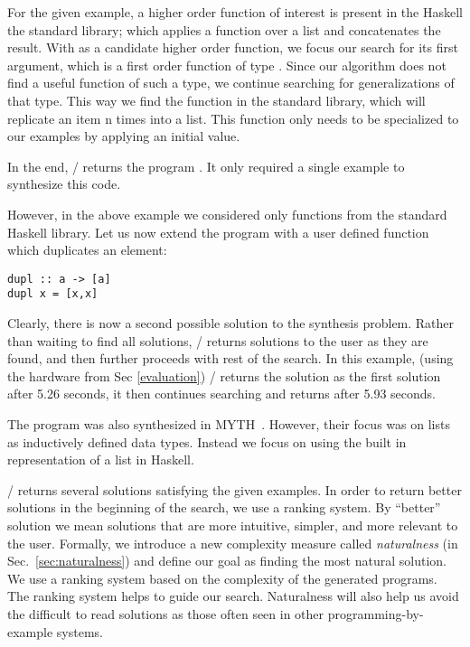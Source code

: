 For the given example, a higher order function of interest is present in the Haskell the standard library;  which applies a function over a list and concatenates the result.
With  as a candidate higher order function, we focus
 our search for its first argument, which is a first order function of type .
Since our algorithm does not find a useful function of such a type, we continue searching for generalizations of that type.
This way we find the function  in the standard library, which will replicate an item n times into a list.
This function only needs to be specialized to our examples by applying an initial value.

In the end, \ourTool/ returns the program . It only required a single example to synthesize this code.

However, in the above example we considered only functions from the standard Haskell library. Let us now extend the program with a user defined function  which duplicates an element:
\begin{lstlisting}
dupl :: a -> [a]
dupl x = [x,x]
\end{lstlisting}

Clearly, there is now a second possible solution to the synthesis problem.
Rather than waiting to find all solutions, \ourTool/ returns solutions to the user as they are found, and then further proceeds with rest of the search.
In this example, (using the hardware from Sec \ref{evaluation}) \ourTool/ returns the solution  as the first solution after 5.26 seconds, it then continues searching and returns  after 5.93 seconds.

The  program was also synthesized in MYTH~\cite{Osera:2015}. However, their focus was on lists as inductively defined data types. 
Instead we focus on using the built in representation of a list in Haskell.

\ourTool/ returns several solutions satisfying the given examples. In
 order to return better solutions in the beginning of the search, we use a ranking system. By ``better'' solution we mean solutions that are more intuitive, simpler, and more relevant to the user. Formally, we introduce a new complexity measure called \textit{naturalness} (in 
Sec.~\ref{sec:naturalness}) and define our goal as finding the most natural solution. We use a ranking system based on the complexity of the 
generated programs. The ranking system helps to guide our search.
Naturalness will also help us avoid the difficult to read solutions as those often seen in other programming-by-example systems.



